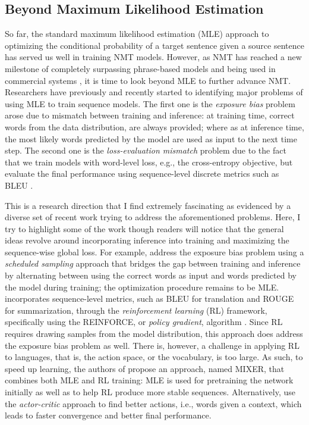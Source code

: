 \subsection{Beyond Maximum Likelihood Estimation}
So far, the standard maximum likelihood estimation (MLE) approach 
to optimizing the conditional probability of a target sentence given a source sentence 
has served us well in training NMT models. However, as NMT has reached a new milestone of completely surpassing phrase-based models and being used in commercial systems \cite{gnmt16,systran16}, it is time to look beyond MLE to further advance NMT. Researchers have previously and recently started to identifying major problems of using MLE to train sequence models. The first one is the {\it exposure bias} problem \cite{bengio15} arose due to mismatch between training and inference: at training time, correct words from the data distribution, are always provided; where as at inference time, the most likely words predicted by the model are used as input to the next time step. The second one is the {\it loss-evaluation mismatch} problem \cite{ranzato16} due to the fact that we train models with word-level loss, e.g., the cross-entropy objective, but evaluate the final performance using sequence-level discrete metrics such as BLEU \cite{Papineni02bleu}. 

This is a research direction that I find extremely fascinating as evidenced by a diverse set of recent work trying to address the aforementioned problems. Here, I try to  highlight some of the work though readers will notice that the general ideas revolve around incorporating inference into training and maximizing the sequence-wise global loss. For example,  address the exposure bias problem using a {\it scheduled sampling} approach that bridges the gap between training and inference by alternating between using the correct words as input and words predicted by the model during training; the optimization procedure remains to be MLE.  incorporates sequence-level metrics, such as BLEU for translation and ROUGE for summarization, through the {\it reinforcement learning} (RL) framework, specifically using the REINFORCE, or {\it policy gradient}, algorithm \cite{reinforce}. Since RL requires drawing samples from the model distribution, this approach does address the exposure bias problem as well. There is, however, a challenge in applying RL to languages, that is, the action space, or the vocabulary, is too large. As such, to speed up learning, the authors of \cite{ranzato16} propose an approach, named MIXER, that combines both MLE and RL training: MLE is used for pretraining the network initially as well as to help RL produce more stable sequences. Alternatively,  use the {\it actor-critic} approach to find better actions, i.e., words given a context, which leads to faster convergence and better final performance.

